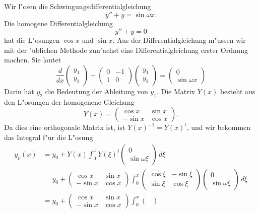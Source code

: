 \begin{beispiel}
Wir l"osen die Schwingungsdifferentialgleichung 
\[
y''+y=\sin\omega x.
\]
Die homogene Differentialgleichung 
\[
y''+y=0
\]
hat die L"osungen $\cos x$ und $\sin x$.
Aus der Differentialgleichung m"ussen wir mit der "ublichen Methode
zun"achst eine Differentialgleichung erster Ordnung machen.
Sie lautet
\[
\frac{d}{dx}\begin{pmatrix}y_1\\y_2\end{pmatrix}
+
\begin{pmatrix}
 0&-1\\
 1& 0
\end{pmatrix}
\begin{pmatrix}
y_1\\y_2
\end{pmatrix}
=
\begin{pmatrix}0\\\sin\omega x \end{pmatrix}
\]
Darin hat $y_2$ die Bedeutung der Ableitung von $y_1$.
Die Matrix $Y(x)$ besteht aus den L"osungen der homogenene
Gleichung
\[
Y(x)
=
\begin{pmatrix}
 \cos x& \sin x\\
-\sin x& \cos x
\end{pmatrix}.
\]
Da dies eine orthogonale Matrix ist, ist $Y(x)^{-1}=Y(x)^t$,
und wir bekommen das Integral f"ur die L"osung
\begin{align*}
y_p(x)
&=
y_0+Y(x)\int_0^x Y(\xi)^t
\begin{pmatrix}0\\\sin\omega\xi\end{pmatrix}
\,d\xi
\\
&=
y_0
+
\begin{pmatrix}
 \cos x& \sin x\\
-\sin x& \cos x
\end{pmatrix}
\int_0^x
\begin{pmatrix}
 \cos \xi&-\sin \xi\\
 \sin \xi& \cos \xi
\end{pmatrix}
\begin{pmatrix}0\\\sin\omega\xi\end{pmatrix}
\,d\xi
\\
&=
y_0
+
\begin{pmatrix}
 \cos x& \sin x\\
-\sin x& \cos x
\end{pmatrix}
\int_0^x
\begin{pmatrix}

\end{pmatrix}
\end{align*}
\end{beispiel}

